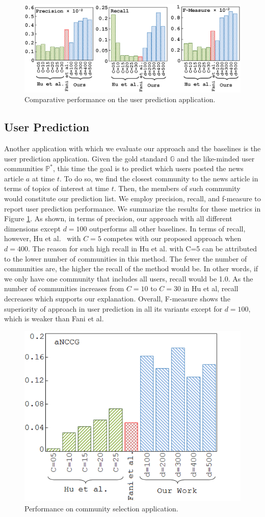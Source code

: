 \documentclass[sigconf]{acmart}
\begin{document}
\begin{figure}[t]
\centering
\includegraphics[width=1.05\columnwidth]{Images/user_prediction.eps}
\caption{Comparative performance on the user prediction application.}\label{user_prediction}
\end{figure}

\subsection{User Prediction}
Another application with which we evaluate our approach and the baselines is the user prediction application. Given the gold standard $\mathbb{G}$ and the like-minded user communities $\mathbb{P}^*$, this time the goal is to predict which users posted the news article $a$ at time $t$. To do so, we find the closest community to the news article in terms of topics of interest at time $t$. Then, the members of such community would constitute our prediction list. We employ precision, recall, and f-measure to report user prediction performance. We summarize the results for these metrics in Figure \ref{user_prediction}. As shown, in terms of precision, our approach with all different dimensions except $d=100$ outperforms all other baselines. In terms of recall, however, Hu et al.~\cite{DBLP:conf/aaai/HuYC14} with $C=5$ competes with our proposed approach when $d=400$. The reason for such high recall in Hu et al. with C=5 can be attributed to the lower number of communities in this method. The fewer the number of communities are, the higher the recall of the method would be. In other words, if we only have one community that includes all users, recall would be 1.0. As the number of communities increases from $C=10$ to $C=30$ in Hu et al, recall decreases which supports our explanation. Overall, F-measure shows the superiority of approach in user prediction in all its variants except for $d=100$, which is weaker than Fani et al. 
\begin{figure}[t]
\centering
\includegraphics[width=.6\columnwidth]{Images/community_selection.png}
\caption{Performance on community selection application.\label{community_selection}}
\end{figure}
\end{document}
